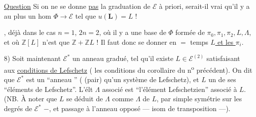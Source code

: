 \uline{Question} Si on ne se donne \uline{pas} la graduation de $\mathcal E$ à priori,
serait-il vrai qu'il y a au plus un hom $\Phi\longrightarrow\mathcal E$ tel que $u(\mathbf L)=L$ !

, déjà dans le cas $n=1$, $2n=2$, où il y a une base de $\Phi$ formée de $\pi_0,\pi_1,\pi_2,L,\Lambda$, et où $\mathbb Z[L]$ n'est que $\mathbb Z+\mathbb ZL$ ! Il faut donc se donner en $=$ temps \uline{$L$ et les $\pi_i$}.

8) Soit maintenant $\mathcal E^*$ un anneau gradué,  tel qu'il existe $L\in\mathcal E^{(2)}$ satisfaisant aux \uline{conditions de Lefschetz} ( les conditions du corollaire du n\textsuperscript{o} précédent). On dit que $\mathcal E^*$ est un ``anneau '' (    (pair) qu'un système de Lefschetz), et $L$ un de ses ``éléments de Lefschetz''.
L'élt $\Lambda$ associé est  ``l'élément  Lefschetzien'' associé à $L$.
(NB. À noter que $L$ se déduit de $\Lambda$ comme $\Lambda$ de $L$, par simple symétrie sur les degrés de $\mathcal E^*$  $-$, et passage à l'anneau opposé ---  isom de transposition ---).

